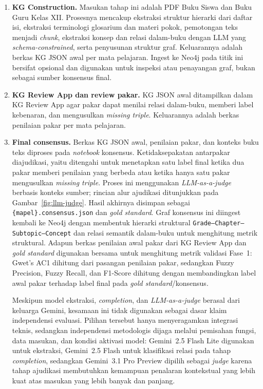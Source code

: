 \documentclass[../../thesis]{subfiles}
\begin{document}
\begin{enumerate}
  \item \textbf{KG Construction.} Masukan tahap ini adalah PDF Buku Siswa
        dan Buku Guru Kelas XII. Prosesnya mencakup ekstraksi struktur
        hierarki dari daftar isi, ekstraksi terminologi glosarium dan
        materi pokok, pemotongan teks menjadi \textit{chunk}, ekstraksi
        konsep dan relasi dalam-buku dengan LLM yang
        \textit{schema-constrained}, serta penyusunan struktur graf.
        Keluarannya adalah berkas KG JSON awal per mata pelajaran. Ingest
        ke Neo4j pada titik ini bersifat opsional dan digunakan untuk
        inspeksi atau penayangan graf, bukan sebagai sumber konsensus
        final.

  \item \textbf{KG Review App dan review pakar.} KG JSON awal
        ditampilkan dalam KG Review App agar pakar dapat menilai relasi
        dalam-buku, memberi label kebenaran, dan mengusulkan
        \textit{missing triple}. Keluarannya adalah berkas penilaian
        pakar per mata pelajaran.

  \item \textbf{Final consensus.} Berkas KG JSON awal, penilaian pakar,
        dan konteks buku teks diproses pada \textit{notebook} konsensus.
        Ketidaksepakatan antarpakar diajudikasi, yaitu ditengahi untuk
        menetapkan satu label final ketika dua pakar memberi penilaian yang
        berbeda atau ketika hanya satu pakar mengusulkan \textit{missing
        triple}. Proses ini menggunakan \textit{LLM-as-a-judge} berbasis
        konteks sumber; rincian alur ajudikasi ditunjukkan pada
        Gambar~\ref{fig:llm-judge}. Hasil
        akhirnya disimpan sebagai \texttt{\{mapel\}.consensus.json} dan
        \textit{gold standard}. Graf konsensus ini diingest kembali ke
        Neo4j dengan membentuk hierarki struktural
        \texttt{Grade--Chapter--Subtopic--Concept} dan relasi semantik
        dalam-buku untuk menghitung metrik struktural. Adapun berkas penilaian
        awal pakar dari KG Review App dan \textit{gold standard} digunakan
        bersama untuk menghitung metrik validasi Fase~1: Gwet's AC1 dihitung
        dari pasangan penilaian pakar, sedangkan Fuzzy Precision, Fuzzy Recall, dan F1-Score
        dihitung dengan membandingkan label awal pakar terhadap label final
        pada \textit{gold standard}/konsensus.

        Meskipun model ekstraksi, \textit{completion}, dan
        \textit{LLM-as-a-judge} berasal dari keluarga Gemini, kesamaan ini
        tidak digunakan sebagai dasar klaim independensi evaluasi. Pilihan
        tersebut hanya menyeragamkan integrasi teknis, sedangkan independensi
        metodologis dijaga melalui pemisahan fungsi, data masukan, dan kondisi
        aktivasi model: Gemini~2.5 Flash Lite digunakan untuk ekstraksi,
        Gemini~2.5 Flash untuk klasifikasi relasi pada tahap
        \textit{completion}, sedangkan Gemini~3.1 Pro Preview dipilih sebagai
        \textit{judge} karena tahap ajudikasi membutuhkan kemampuan penalaran
        kontekstual yang lebih kuat atas masukan yang lebih banyak dan panjang.


\end{enumerate}
\end{document}
